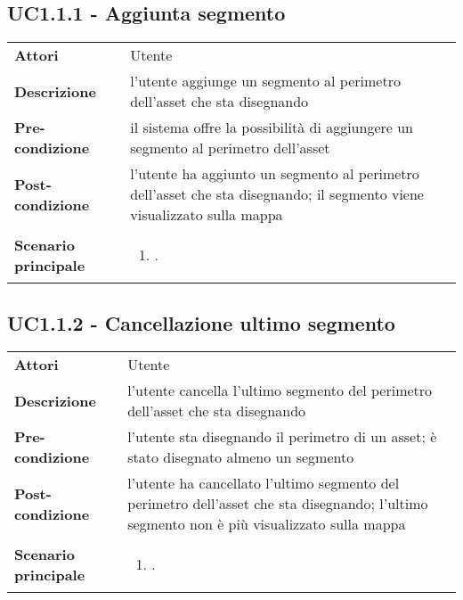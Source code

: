 \subsection{UC1.1.1 - Aggiunta segmento} 
\label{sssec:UC1.1.1} 
\def\arraystretch{1.5}
\begin{tabularx}{\textwidth}{l|p{}}
	\rowcolor{I} \multicolumn{2}{c}{\color{white}\textbf{UC1.1.1 - Aggiunta segmento}} \\
	\toprule
	\endhead
	\textbf{Attori} & Utente\\
	\textbf{Descrizione} & l'utente aggiunge un segmento al perimetro dell'asset che sta disegnando\\
	\textbf{Pre-condizione} & il sistema offre la possibilità di aggiungere un segmento al perimetro dell'asset\\
	\textbf{Post-condizione} & l'utente ha aggiunto un segmento al perimetro dell'asset che sta disegnando; il segmento viene visualizzato sulla mappa\\
	\textbf{Scenario principale} & \vspace{-1.2em}\begin{enumerate}[leftmargin=*,noitemsep,nosep]
		\item \nameref{sssec:UC1.1.1}.
	\end{enumerate}\\
	\bottomrule
\end{tabularx}
\subsection{UC1.1.2 - Cancellazione ultimo segmento} 
\label{sssec:UC1.1.2} 
\def\arraystretch{1.5}
\begin{tabularx}{\textwidth}{l|p{}}
	\rowcolor{I} \multicolumn{2}{c}{\color{white}\textbf{UC1.1.2 - Cancellazione ultimo segmento}} \\
	\toprule
	\endhead
	\textbf{Attori} & Utente\\
	\textbf{Descrizione} & l'utente cancella l'ultimo segmento del perimetro dell'asset che sta disegnando\\
	\textbf{Pre-condizione} & l'utente sta disegnando il perimetro di un asset; è stato disegnato almeno un segmento\\
	\textbf{Post-condizione} & l'utente ha cancellato l'ultimo segmento del perimetro dell'asset che sta disegnando; l'ultimo segmento non è più visualizzato sulla mappa\\
	\textbf{Scenario principale} & \vspace{-1.2em}\begin{enumerate}[leftmargin=*,noitemsep,nosep]
		\item \nameref{sssec:UC1.1.2}.
	\end{enumerate}\\
	\bottomrule
\end{tabularx}
